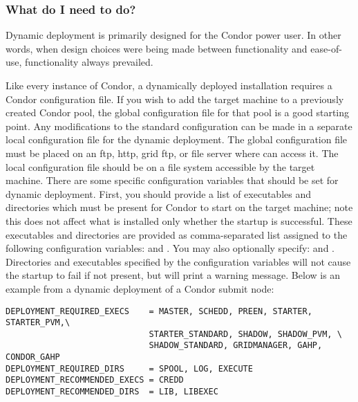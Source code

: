 \subsubsection{What do I need to do?}

Dynamic deployment is primarily designed for the Condor power user.
In other words, when design choices were being made between
functionality and ease-of-use, functionality always prevailed.

Like every instance of Condor, a dynamically deployed installation
requires a Condor configuration file.  If you wish to add the target
machine to a previously created Condor pool, the global configuration
file for that pool is a good starting point.  Any modifications to the
standard configuration can be made in a separate local configuration
file for the dynamic deployment.  The global configuration file must
be placed on an ftp, http, grid ftp, or file server where
 can access it.  The local configuration file
should be on a file system accessible by the target machine.  There
are some specific configuration variables that should be set for
dynamic deployment.  First, you should provide a list of executables
and directories which must be present for Condor to start on the
target machine; note this does not affect what is installed only
whether the startup is successful.  These executables and directories
are provided as comma-separated list assigned to the following
configuration variables:  and
.  You may also optionally specify:
 and
.  Directories and executables
specified by the  configuration variables will
not cause the startup to fail if not present, but will print a warning
message.  Below is an example from a dynamic deployment of a Condor
submit node:

\footnotesize
\begin{verbatim}
DEPLOYMENT_REQUIRED_EXECS    = MASTER, SCHEDD, PREEN, STARTER, STARTER_PVM,\
                             STARTER_STANDARD, SHADOW, SHADOW_PVM, \
                             SHADOW_STANDARD, GRIDMANAGER, GAHP, CONDOR_GAHP
DEPLOYMENT_REQUIRED_DIRS     = SPOOL, LOG, EXECUTE
DEPLOYMENT_RECOMMENDED_EXECS = CREDD
DEPLOYMENT_RECOMMENDED_DIRS  = LIB, LIBEXEC
\end{verbatim}
\normalsize

